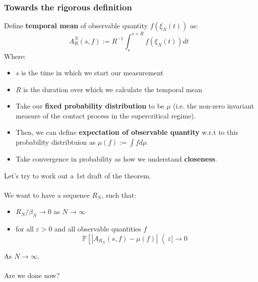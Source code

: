 \documentclass{beamer}
\begin{document}
\begin{frame}
    \frametitle{Towards the rigorous definition}

    Define \textbf{temporal mean} of observable quantity $f(\xi_N(t))$ as:
    \[
        A^N_R(s, f) := R^{-1}\int_s^{s+R}f(\xi_N(t))dt
    \]
    Where:
    \begin{itemize}
        \item $s$ is the time in which we start our measurement
        \item $R$ is the duration over which we calculate the temporal mean
    \end{itemize}
\end{frame}

\begin{frame}
    \begin{itemize}
        \item Take our \textbf{fixed probability distribution} to be $\mu$ (i.e. the non-zero invariant measure of the contact process in the supercritical regime).
        \item Then, we can define \textbf{expectation of observable quantity} w.r.t to this probability distribtuion as $\mu(f) := \int fd\mu$ 
        \item Take convergence in probability as how we understand \textbf{closeness}.
    \end{itemize}
\end{frame}

\begin{frame}
    Let's try to work out a 1st draft of the theorem. \\~\\
    We want to have a sequence $R_N$, such that:
    \begin{itemize}
        \item $R_N / \beta_N \rightarrow 0$ as $N \rightarrow \infty$
        \item for all $\varepsilon > 0$ and all observable quantities $f$
        \[
            \mathbb{P}\left[ |A_{R_N}(s, f) - \mu(f)|\right < \varepsilon] \rightarrow 0
        \]
    \end{itemize}

    As $N \rightarrow \infty$. \\~\\
    Are we done now?
\end{frame}
\end{document}
